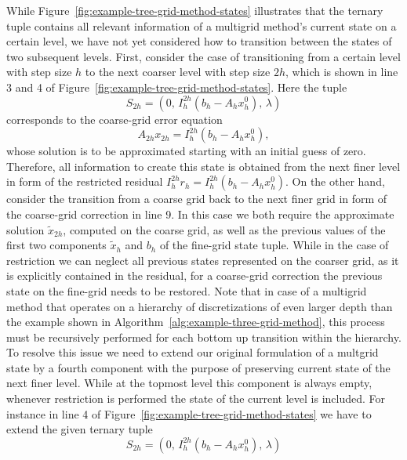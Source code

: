 While Figure~\ref{fig:example-tree-grid-method-states} illustrates that the ternary tuple contains all relevant information of a multigrid method's current state on a certain level, we have not yet considered how to transition between the states of two subsequent levels.
First, consider the case of transitioning from a certain level with step size $h$ to the next coarser level with step size $2h$, which is shown in line 3 and 4 of Figure~\ref{fig:example-tree-grid-method-states}.
Here the tuple
\begin{equation*}
	S_{2h} = (0, \, I_{h}^{2h}(b_{h} - A_h x_{h}^0), \, \lambda)
\end{equation*} 
corresponds to the coarse-grid error equation 
\begin{equation*}
	A_{2h} x_{2h} = I_{h}^{2h}(b_{h} - A_h x_{h}^0),
\end{equation*}
whose solution is to be approximated starting with an initial guess of zero.
Therefore, all information to create this state is obtained from the next finer level in form of the restricted residual $I_h^{2h} r_h = I_h^{2h} (b_{h} - A_h x_{h}^0)$.
On the other hand, consider the transition from a coarse grid back to the next finer grid in form of the coarse-grid correction in line 9.
In this case we both require the approximate solution $\tilde{x}_{2h}$, computed on the coarse grid, as well as the previous values of the first two components $\tilde{x}_h$ and $b_h$ of the fine-grid state tuple.
While in the case of restriction we can neglect all previous states represented on the coarser grid, as it is explicitly contained in the residual, for a coarse-grid correction the previous state on the fine-grid needs to be restored.
Note that in case of a multigrid method that operates on a hierarchy of discretizations of even larger depth than the example shown in Algorithm~\ref{alg:example-three-grid-method}, this process must be recursively performed for each bottom up transition within the hierarchy.
To resolve this issue we need to extend our original formulation of a multgrid state by a fourth component with the purpose of preserving current state of the next finer level.
While at the topmost level this component is always empty, whenever restriction is performed the state of the current level is included.
For instance in line 4 of Figure~\ref{fig:example-tree-grid-method-states} we have to extend the given ternary tuple 
\begin{equation*}
S_{2h} = (0, \, I_{h}^{2h}(b_{h} - A_h x_{h}^0), \, \lambda)
\end{equation*}
